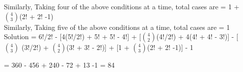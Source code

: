 \documentclass[a4paper]{article}
\begin{document}
\begin{enumerate}
Similarly, Taking four of the above conditions at a time, total cases are = 1 + $4 \choose 3$(2! + 2! -1)\\

Similarly, Taking five of the above conditions at a time, total cases are = 1 \\

Solution = 6!/2! - 
[4(5!/2!) + 5! + 5! - 4!] + 
[$4 \choose 2$(4!/2!) + 4(4! + 4! - 3!)] -
[$4 \choose 3$ (3!/2!) + $4 \choose 2$(3! + 3! - 2!)]  + 
[1 + $4 \choose 3$(2! + 2! -1)] -
1

= 360 - 456 + 240 - 72 + 13 -1 = 84
  
\end{enumerate}
\end{document}
